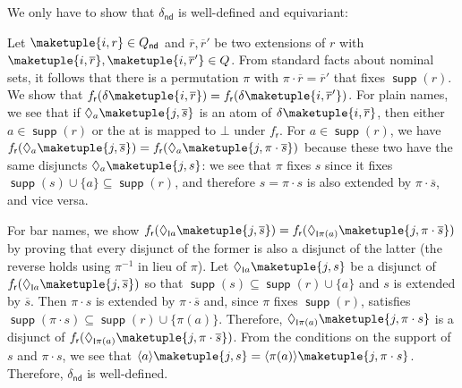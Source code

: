 \documentclass[10pt,a4paper]{amsart}
\theoremstyle{definition}
\newcommand{\seq}{\subseteq}
\newcommand{\op}[1]{\operatorname{\mathsf{#1}}}
\newcommand{\nd}{\op{nd}}
\DeclareMathOperator{\supp}{\mathsf{supp}}
\newcommand{\braket}[1]{\langle #1 \rangle}
\newcommand{\set}[1]{\{#1\}}
\newcommand{\scriptmidmid}{\hspace{0.2ex}{\rule[-0.1ex]{0.6pt}{1.1ex}}\hspace{0.2ex}}
\newcommand{\scriptnew}[1]{{\scriptmidmid}#1}
\begin{document}
\begin{IEEEproof}
  We only have to show that $\delta_{\nd}$ is well-defined and equivariant:

  Let $\maketuple{i, r} \in Q_{\nd}$ and $\overline{r}, \overline{r}'$ be two extensions of $r$ with
  $\maketuple{i, \overline{r}}, \maketuple{i, \overline{r}'} \in Q$. From standard facts about nominal
  sets, it follows that there is a permutation $\pi$ with $\pi\cdot \overline{r} = \overline{r}'$
  that fixes $\supp(r)$. We show that $f_{\mathsf{r}}(\delta\maketuple{i,\overline{r}}) = f_{\mathsf{r}}(\delta\maketuple{i,\overline{r}'})$.
  For plain names, we see that if $\Diamond_a \maketuple{j,\overline{s}}$ is an atom of $\delta\maketuple{i, \overline{r}}$,
  then either $a \in \supp(r)$ or the at is mapped to $\bot$ under $f_{\mathsf{r}}$.
  For $a \in \supp(r)$, we have $f_{\mathsf{r}}(\Diamond_a \maketuple{j,\overline{s}}) = f_{\mathsf{r}}(\Diamond_a \maketuple{j,\pi\cdot\overline{s}})$
  because these two have the same disjuncts $\Diamond_a\maketuple{j,s}$: we see that $\pi$ fixes $s$ since it fixes
  $\supp(s) \cup \set{a} \seq \supp(r)$, and therefore $s = \pi\cdot s$ is also extended by $\pi\cdot\overline s$, and vice versa.

  For bar names, we show $f_{\mathsf{r}}(\Diamond_{\scriptnew{a}} \maketuple{j,\overline{s}}) = f_{\mathsf{r}}(\Diamond_{\scriptnew{\pi(a)}} \maketuple{j,\pi\cdot\overline{s}})$
  by proving that every disjunct of the former is also a disjunct of the latter (the reverse holds using $\pi^{-1}$ in lieu of $\pi$).
  Let $\Diamond_{\scriptnew{a}} \maketuple{j, s}$ be a disjunct of $f_{\mathsf{r}}(\Diamond_{\scriptnew{a}} \maketuple{j,\overline{s}})$
  so that $\supp(s) \seq \supp(r) \cup \set{a}$ and $s$ is extended by $\overline{s}$. Then $\pi\cdot s$ is extended by
  $\pi\cdot\overline{s}$ and, since $\pi$ fixes $\supp(r)$, satisfies $\supp(\pi\cdot s) \seq \supp(r) \cup \set{\pi(a)}$.
  Therefore, $\Diamond_{\scriptnew{\pi(a)}} \maketuple{j, \pi\cdot s}$ is a disjunct of $f_{\mathsf{r}}(\Diamond_{\scriptnew{\pi(a)}}
  \maketuple{j,\pi\cdot\overline{s}})$.
  From the conditions on the support of $s$ and $\pi\cdot s$, we see that $\braket{a}\maketuple{j, s} = \braket{\pi(a)}\maketuple{j, \pi\cdot s}$.
  Therefore, $\delta_{\nd}$ is well-defined.


\end{IEEEproof}
\end{document}

